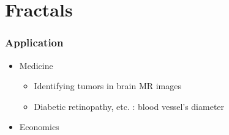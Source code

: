 \section{Fractals}

\begin{frame}
	\frametitle{Application}
	\begin{itemize}
		\item Medicine
		\begin{itemize}
			\item Identifying tumors in brain MR images \cite{iftekharuddin2003fractal}
			\item Diabetic retinopathy, etc. : blood vessel's diameter \cite{uahabi2015applications}
		\end{itemize}
		\item Economics
	\end{itemize}
\end{frame}